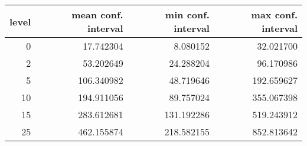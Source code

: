 \begin{tabular}{rrrr}
\toprule
 level &  mean conf. interval &  min conf. interval &  max conf. interval \\
\midrule
     0 &            17.742304 &            8.080152 &           32.021700 \\
     2 &            53.202649 &           24.288204 &           96.170986 \\
     5 &           106.340982 &           48.719646 &          192.659627 \\
    10 &           194.911056 &           89.757024 &          355.067398 \\
    15 &           283.612681 &          131.192286 &          519.243912 \\
    25 &           462.155874 &          218.582155 &          852.813642 \\
\bottomrule
\end{tabular}

